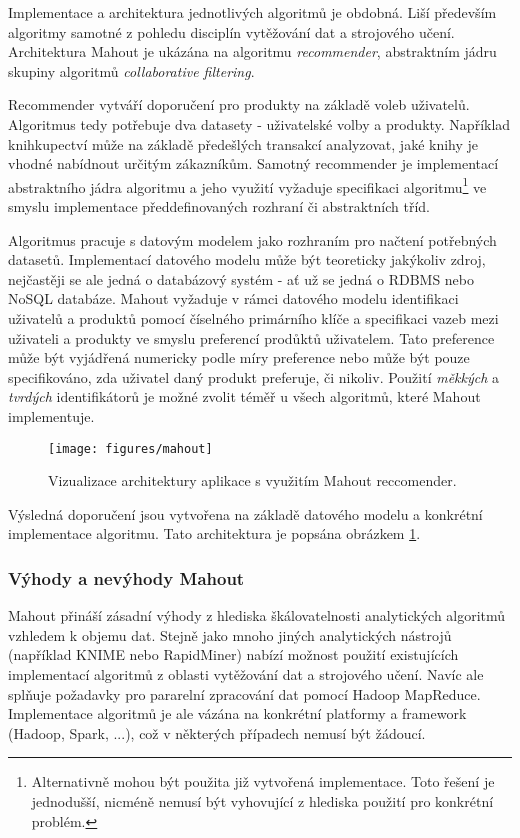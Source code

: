 \documentclass[11pt,twoside,a4paper]{book}
\begin{document}
			Implementace a architektura jednotlivých algoritmů je obdobná. Liší především algoritmy samotné z pohledu disciplín vytěžování dat a strojového učení.\cite{datamining01} Architektura Mahout je ukázána na algoritmu \textit{recommender}, abstraktním jádru skupiny algoritmů \textit{collaborative filtering}.  

			Recommender vytváří doporučení pro produkty na základě voleb uživatelů. Algoritmus tedy potřebuje dva datasety - uživatelské volby a produkty. Například knihkupectví může na základě předešlých transakcí analyzovat, jaké knihy je vhodné nabídnout určitým zákazníkům. Samotný recommender je implementací abstraktního jádra algoritmu a jeho využití vyžaduje specifikaci algoritmu\footnote{Alternativně mohou být použita již vytvořená implementace. Toto řešení je jednodušší, nicméně nemusí být vyhovující z hlediska použití pro konkrétní problém.} ve smyslu implementace předdefinovaných rozhraní či abstraktních tříd.\cite{mahoutb02} 
 
			Algoritmus pracuje s datovým modelem jako rozhraním pro načtení potřebných datasetů. Implementací datového modelu může být teoreticky jakýkoliv zdroj, nejčastěji se ale jedná o databázový systém - ať už se jedná o RDBMS nebo NoSQL databáze. Mahout vyžaduje v rámci datového modelu identifikaci uživatelů a produktů pomocí číselného primárního klíče a specifikaci vazeb mezi uživateli a produkty ve smyslu preferencí prodůktů uživatelem. Tato preference může být vyjádřená numericky podle míry preference nebo může být pouze specifikováno, zda uživatel daný produkt preferuje, či nikoliv. Použití \textit{měkkých} a \textit{tvrdých} identifikátorů je možné zvolit téměř u všech algoritmů, které Mahout implementuje. 

\begin{figure}
\begin{center}
\label{fig:mahout}
\texttt{[image: figures/mahout]}
\caption{Vizualizace architektury aplikace s využitím Mahout reccomender.\cite{mahoutb02}}
\end{center}
\end{figure}	

			Výsledná doporučení jsou vytvořena na základě datového modelu a konkrétní implementace algoritmu. Tato architektura je popsána obrázkem \ref{fig:mahout}.

			\subsubsection{Výhody a nevýhody Mahout}
				Mahout přináší zásadní výhody z hlediska škálovatelnosti analytických algoritmů vzhledem k objemu dat. Stejně jako mnoho jiných analytických nástrojů (například KNIME nebo RapidMiner\cite{rapidminer01}) nabízí možnost použití existujících implementací algoritmů z oblasti vytěžování dat a strojového učení. Navíc ale splňuje požadavky pro pararelní zpracování dat pomocí Hadoop MapReduce. Implementace algoritmů je ale vázána na konkrétní platformy a framework (Hadoop, Spark, ...), což v některých případech nemusí být žádoucí. 
\end{document}
